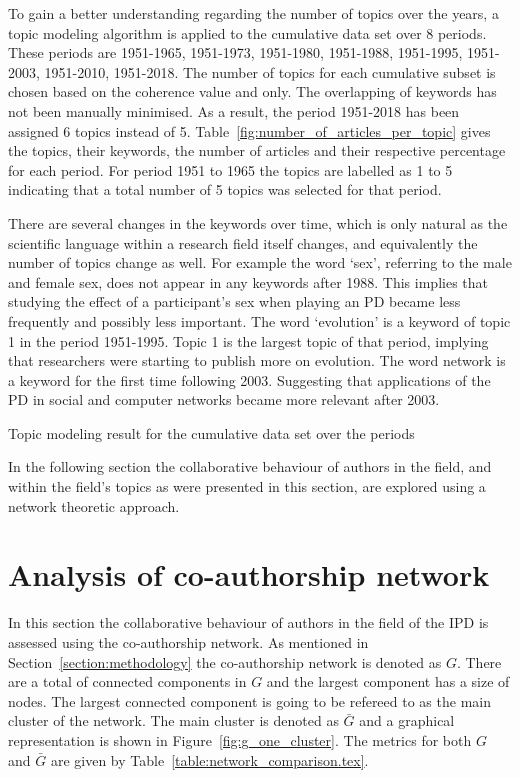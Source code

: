 \documentclass{article}
\theoremstyle{definition}
\newcommand{\connectedcomponents}{}
\newcommand{\largestcc}{}
\begin{document}
To gain a better understanding regarding the number of topics over the years,
a topic modeling algorithm is applied to the cumulative data set over 8 periods.
These periods are 1951-1965, 1951-1973, 1951-1980, 1951-1988,
1951-1995, 1951-2003, 1951-2010, 1951-2018. The number of topics for each cumulative
subset is chosen based on the coherence value and only. The overlapping of keywords has
not been manually minimised. As a result, the period 1951-2018 has been assigned
6 topics instead of 5. Table~\ref{fig:number_of_articles_per_topic} gives the
topics, their keywords, the number of articles and their respective percentage
for each period. For period 1951 to 1965 the topics are labelled as 1 to 5
indicating that a total number of 5 topics was selected for that period.

There are several changes in the keywords over time, which is only natural as
the scientific language within a research field itself changes, and equivalently
the number of topics change as well. For example the word `sex', referring to
the male and female sex, does not appear in any keywords after 1988. This
implies that studying the effect of a participant's sex when playing an PD
became less frequently and possibly less important. The
word `evolution' is a keyword of topic 1 in the period 1951-1995. Topic 1 is
the largest topic of that period, implying that researchers were starting to
publish more on evolution. The word network is a keyword for the first time
following 2003. Suggesting that applications of the PD in social and computer
networks became more relevant after 2003.

\begin{table}[!hbtp]
    \begin{center}
    \resizebox{\textwidth}{!}{
    }
    \end{center}
    \caption{Topic modeling result for the cumulative data set over the periods
    }
\end{table}

In the following section the collaborative behaviour of authors in the field,
and within the field's topics as were presented in this section, are explored
using a network theoretic approach.

\section{Analysis of co-authorship network}\label{section:co_authorship}

In this section the collaborative behaviour of authors in the field of the IPD
is assessed using the co-authorship network. As mentioned in Section~\ref{section:methodology}
the co-authorship network is denoted as \(G\). There are a total of \connectedcomponents
connected components in \(G\) and the largest component has a size of 
\largestcc nodes. The largest connected component is going to be refereed to as
the main cluster of the network. The main cluster is denoted as \(\bar{G}\) and
a graphical representation is shown in Figure~\ref{fig:g_one_cluster}.
The metrics for both \(G\) and \(\bar{G}\) are given by
Table~\ref{table:network_comparison.tex}.
\end{document}
